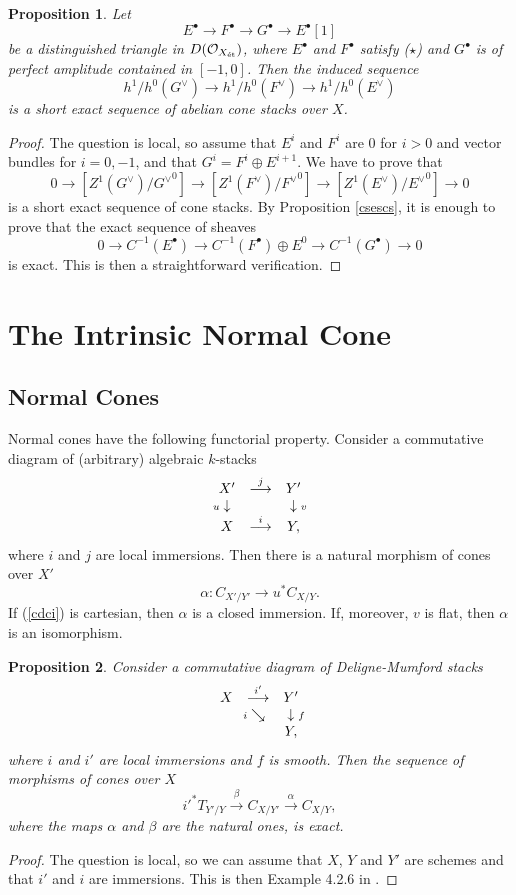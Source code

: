 \documentclass[11pt]{article}
\theoremstyle{plain}
\newtheorem{prop}{Proposition}[section]
\theoremstyle{definition}
\newenvironment{pf}{\begin{proof}}{\end{proof}}
\newcommand{\dual}[1]{{{#1}^{\vee}}}
\newcommand{\et}{{\mbox{\tiny \'{e}t}}}
\newcommand{\upst}{^{\ast}}
\newcommand{\com}{^{\scriptscriptstyle\bullet}}
\renewcommand{\O}{{\mathcal{O}}}
\newcommand{\ldiag}[1]
       {\makebox[0cm]{\({\scriptstyle#1}\downarrow\phantom{\scriptstyle#1}\)}}
\newcommand{\rdiag}[1]
       {\makebox[0cm]{\(\phantom{\scriptstyle#1}\downarrow{\scriptstyle#1}\)}}
\newcommand{\sediag}[1]
       {\makebox[0cm]{\({\scriptstyle#1}\searrow\phantom{\scriptstyle#1}\)}}
\newcommand{\comdia}[9]{
\begin{array}{ccc}
#1 & \stackrel{#2}{\longrightarrow} & #3 \\
\ldiag{#4} & #5 & \rdiag{#6} \\
#7 & \stackrel{#8}{\longrightarrow} & #9
\end{array}}
\newcommand{\comtri}[6]{
\begin{array}{ccc}
#1 & \stackrel{#2}{\longrightarrow} & #3         \\
   & \sediag{#4}                    & \rdiag{#5} \\
   &                                & #6
\end{array}}
\newcommand{\ses}[5]
{0\longrightarrow#1\stackrel{#2}{ \longrightarrow}#3\stackrel{#4}{
\longrightarrow}#5\longrightarrow0}
\newcommand{\dt}[6]
{#1\stackrel{#2}{\longrightarrow}#3 \stackrel{#4}{\longrightarrow}#5
\stackrel{#6}{\longrightarrow} #1[1]}
\theoremstyle{plain}
\theoremstyle{definition}
\theoremstyle{remark}
\begin{document}
\begin{prop} \label{dtscs}
Let
\[
\dt{E\com}{}{F\com}{}{G\com}{}
\]
be a distinguished triangle in \(D(\O_{X_\et})\), where \(E\com\) and
\(F\com\) satisfy (\(\star\)) and \(G\com\) is of perfect amplitude
contained in \([-1,0]\). Then the induced sequence
\[
h^1/h^0(\dual{G})\longrightarrow h^1/h^0(\dual{F})\longrightarrow
h^1/h^0(\dual{E})
\]
is a short exact sequence of abelian cone stacks over \(X\).
\end{prop}
\begin{pf} The question is local, so assume that
\(E^i\) and \(F^i\) are \(0\) for \(i>0\) and vector bundles for \(i=0,-1\),
and that
\(G^i=F^i\oplus E^{i+1}\). We have to prove that
\[
\ses {[Z^1(\dual{G})/\dual{G}^0]} {} {[Z^1(\dual{F})/\dual{F}^0]}{}
{[Z^1(\dual{E})/\dual{E}^0]}
\]
is a short exact sequence of cone stacks.
By Proposition \ref{csescs}, it is enough to prove that the exact sequence of
sheaves
\[
\ses {C^{-1}(E\com)} {} {C^{-1}(F\com)\oplus E^0}{} {C^{-1}(G\com)}
\]
is exact. This is then a straightforward verification.
\end{pf}


\section{The Intrinsic Normal Cone} \label{stinc}

\subsection{Normal Cones}

Normal cones have the following functorial property. Consider a commutative
diagram of (arbitrary) algebraic \(k\)-stacks
\begin{equation} \label{cdci}
\comdia{X'}{j}{Y'}{u}{}{v}{X}{i}{Y,}
\end{equation} where \(i\) and \(j\) are local immersions. Then there is
a natural morphism of cones over \(X'\)
\[
\alpha:C_{X'/Y'}\longrightarrow u\upst C_{X/Y}.
\]
If (\ref{cdci}) is
cartesian, then \(\alpha\) is a closed immersion. If, moreover, \(v\) is
flat, then \(\alpha\) is an isomorphism.

\begin{prop} \label{lonc} Consider a commutative diagram of Deligne-Mumford
stacks
\[
\comtri{X}{i'}{Y'}{i}{f}{Y,}
\]
where \(i\) and \(i'\) are local immersions
and
\(f\) is smooth. Then the sequence of morphisms of cones over \(X\)
\begin{equation} \label{sesc} {i'}\upst
T_{Y'/Y}\stackrel{\beta}{\longrightarrow}C_{X/Y'}\stackrel{
\alpha}{\longrightarrow}C_{X/Y},
\end{equation}
where the maps \(\alpha\) and \(\beta\) are the natural ones, is exact.
\end{prop}
\begin{pf} The question is local, so we can assume that \(X\), \(Y\) and \(Y'\) are
schemes and that \(i'\) and \(i\) are immersions. This is then Example 4.2.6 in
\cite{fulton}.
\end{pf}
\end{document}
